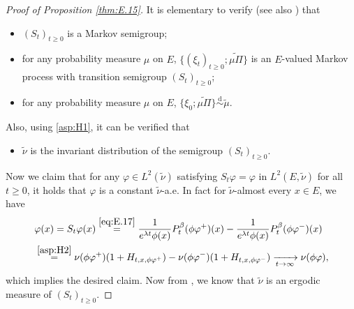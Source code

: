 \documentclass[12pt,a4paper]{amsart}
\numberwithin{equation}{section}
\theoremstyle{plain}
\theoremstyle{definition}
\theoremstyle{remark}
\begin{document}
\begin{proof}[Proof of Proposition \ref{thm:E.15}]
	It is elementary to verify (see also \cite{KimSong2008Intrinsic}) that
\begin{itemize}
\item
	$(S_t)_{t\geq 0}$ is a Markov semigroup;
\item
	for any probability measure $\mu$ on $E$, $\{(\xi_t)_{t\geq 0}; \widetilde{\mu \Pi}\}$ is an $E$-valued Markov process with transition semigroup $(S_t)_{t\geq 0}$;
\item
	for any probability measure $\mu$ on $E$, $\{\xi_0; \widetilde{\mu \Pi}\} \overset{\text{d}}\sim \widetilde \mu$.
\end{itemize}	
	Also, using \eqref{asp:H1}, it can be verified that
\begin{itemize}
	\item
	$\widetilde \nu$ is 
the invariant distribution of the
	semigroup $(S_t)_{t\geq 0}$.
\end{itemize}
	Now we claim that for any $\varphi \in L^2(\widetilde \nu)$ satisfying $S_t \varphi = \varphi$ in $L^2(E,\widetilde \nu)$ for all $t\geq 0$, it holds that $\varphi$ is a constant $\widetilde \nu$-a.e.
	In fact for $\widetilde \nu$-almost every $x\in E$, we have
\begin{align}
	&\varphi(x)
	= S_t \varphi(x)
	\overset{\eqref{eq:E.17}}= \frac{1}{e^{\lambda t}\phi(x)}P_t^\beta (\phi \varphi^+) (x) - \frac{1}{e^{\lambda t}\phi(x)}P_t^\beta (\phi \varphi^-) (x)
	\\&\overset{\eqref{asp:H2}}{=}  \nu(\phi \varphi^+) (1+ H_{t,x,\phi \varphi^+}) - \nu(\phi \varphi^-) (1+ H_{t,x,\phi \varphi^-})
	\xrightarrow[t\to \infty]{} \nu( \phi \varphi),
\end{align}
	which implies the desired claim.
	Now from \cite[Theorem 3.2.4.]{DaPratoZabczyk1996Ergodicity}, we know that $\widetilde \nu$ is an ergodic measure of $(S_t)_{t\geq 0}$.
\end{proof}
\end{document}

